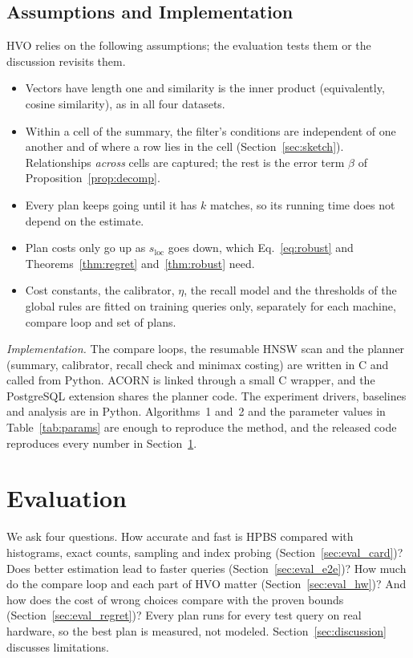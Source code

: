 \documentclass[sigconf,nonacm]{acmart}
\newcommand{\sloc}{s_{\text{loc}}}
\begin{document}
\subsection{Assumptions and Implementation}\label{sec:assume}
HVO relies on the following assumptions; the evaluation tests them or the discussion revisits them.
\begin{itemize}
    \item Vectors have length one and similarity is the inner product (equivalently, cosine similarity), as in all four datasets.
    \item Within a cell of the summary, the filter's conditions are independent of one another and of where a row lies in the cell (Section~\ref{sec:sketch}). Relationships \emph{across} cells are captured; the rest is the error term $\beta$ of Proposition~\ref{prop:decomp}.
    \item Every plan keeps going until it has $k$ matches, so its running time does not depend on the estimate.
    \item Plan costs only go up as $\sloc$ goes down, which Eq.~\eqref{eq:robust} and Theorems~\ref{thm:regret} and~\ref{thm:robust} need.
    \item Cost constants, the calibrator, $\eta$, the recall model and the thresholds of the global rules are fitted on training queries only, separately for each machine, compare loop and set of plans.
\end{itemize}
\emph{Implementation.} The compare loops, the resumable HNSW scan and the planner (summary, calibrator, recall check and minimax costing) are written in C and called from Python. ACORN is linked through a small C wrapper, and the PostgreSQL extension shares the planner code. The experiment drivers, baselines and analysis are in Python. Algorithms~1 and~2 and the parameter values in Table~\ref{tab:params} are enough to reproduce the method, and the released code reproduces every number in Section~\ref{sec:eval}.

\section{Evaluation}\label{sec:eval}
We ask four questions. How accurate and fast is HPBS compared with histograms, exact counts, sampling and index probing (Section~\ref{sec:eval_card})? Does better estimation lead to faster queries (Section~\ref{sec:eval_e2e})? How much do the compare loop and each part of HVO matter (Section~\ref{sec:eval_hw})? And how does the cost of wrong choices compare with the proven bounds (Section~\ref{sec:eval_regret})? Every plan runs for every test query on real hardware, so the best plan is measured, not modeled. Section~\ref{sec:discussion} discusses limitations.
\end{document}
